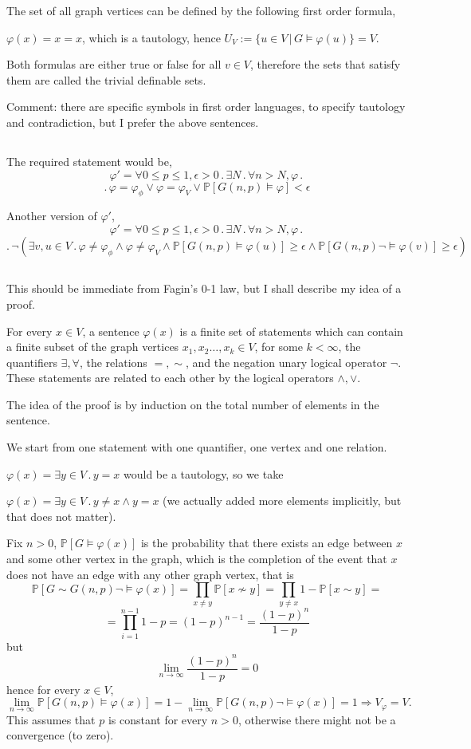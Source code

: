 \documentclass{article}
\begin{document}
The set of all graph vertices can be defined by the following first order formula,

$\varphi(x)=x=x$, which is a tautology, hence $U_V:=\{u\in{V}\,|\,{G\vDash\varphi(u)}\}=V$.

Both formulas are either true or false for all $v\in{V}$, therefore the sets that satisfy them are called the trivial definable sets.

Comment: there are specific symbols in first order languages, to specify tautology and contradiction, but I prefer the above sentences.
\subsection{}
The required statement would be,
\noindent
\[\varphi'=\forall{0\leq{p}\leq{1}},\epsilon>0\,.\,\exists{N}\,.\,\forall{n>N},\varphi\,.\,\]\[.\,\varphi=\varphi_\phi\lor\varphi=\varphi_V\lor\mathbb{P}[G(n,p)\vDash\varphi]<\epsilon\]

Another version of $\varphi'$,
\noindent
\[\varphi'=\forall{0\leq{p}\leq{1}},\epsilon>0\,.\,\exists{N}\,.\,\forall{n>N},\varphi\,.\,\]\[.\,\neg(\exists{v,u\in{V}}\,.\,\varphi\neq\varphi_\phi\land\varphi\neq\varphi_V\land\mathbb{P}[G(n,p)\vDash\varphi(u)]\geq\epsilon\land\mathbb{P}[G(n,p)\neg\vDash\varphi(v)]\geq\epsilon)\]
\subsection{}
This should be immediate from Fagin's 0-1 law, but I shall describe my idea of a proof.

For every $x\in{V}$, a sentence $\varphi(x)$ is a finite set of statements which can contain a finite subset of the graph vertices $x_1,x_2\dots,x_k\in{V}$, for some $k<\infty$, the quantifiers $\exists,\forall$, the relations $=,\sim$, and the negation unary logical operator $\neg$. These statements are related to each other by the logical operators $\land,\lor$.

The idea of the proof is by induction on the total number of elements in the sentence.

We start from one statement with one quantifier, one vertex and one relation.

$\varphi(x)=\exists{y\in{V}}\,.\,y={x}$ would be a tautology, so we take 

$\varphi(x)=\exists{y\in{V}}\,.\,y\neq{x}\land{y={x}}$ (we actually added more elements implicitly, but that does not matter).

Fix $n>0$, $\mathbb{P}[G\vDash\varphi(x)]$ is the probability that there exists an edge between $x$ and some other vertex in the graph, which is the completion of the event that $x$ does not have an edge with any other graph vertex, that is \[\mathbb{P}[G\sim{G(n,p)}\neg\vDash\varphi(x)]=\prod_{x\neq{y}}\mathbb{P}[x\nsim{y}]=\prod_{y\neq{x}}1-\mathbb{P}[x\sim{y}]=\]\[=\prod_{i=1}^{n-1}1-p=(1-p)^{n-1}=\frac{(1-p)^n}{1-p}\]
but \[\lim_{n\rightarrow\infty}\frac{(1-p)^n}{1-p}=0\]
hence for every $x\in{V}$, \[\lim_{n\rightarrow\infty}\mathbb{P}[G(n,p)\vDash\varphi(x)]=1-\lim_{n\rightarrow\infty}\mathbb{P}[G(n,p)\neg\vDash\varphi(x)]=1\Rightarrow{V_\varphi={V}}.\]
This assumes that $p$ is constant for every $n>0$, otherwise there might not be a convergence (to zero).
\end{document}
